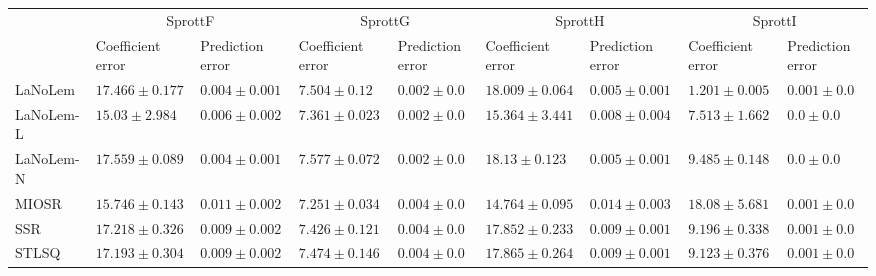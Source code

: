 \begin{table*}
{\begin{tabular}{lllllllll}
 & \multicolumn{2}{c}{SprottF} & \multicolumn{2}{c}{SprottG} & \multicolumn{2}{c}{SprottH} & \multicolumn{2}{c}{SprottI} \\
 & Coefficient error & Prediction error & Coefficient error & Prediction error & Coefficient error & Prediction error & Coefficient error & Prediction error \\
\midrule
LaNoLem & $17.466\pm 0.177$ & $0.004\pm 0.001$ & $7.504\pm 0.12$ & $0.002\pm 0.0$ & $18.009\pm 0.064$ & $0.005\pm 0.001$ & $\mathbf{1.201}\pm 0.005$ & $0.001\pm 0.0$ \\
LaNoLem-L & $\mathbf{15.03}\pm 2.984$ & $0.006\pm 0.002$ & $7.361\pm 0.023$ & $0.002\pm 0.0$ & $15.364\pm 3.441$ & $0.008\pm 0.004$ & $7.513\pm 1.662$ & $0.0\pm 0.0$ \\
LaNoLem-N & $17.559\pm 0.089$ & $\mathbf{0.004}\pm 0.001$ & $7.577\pm 0.072$ & $\mathbf{0.002}\pm 0.0$ & $18.13\pm 0.123$ & $\mathbf{0.005}\pm 0.001$ & $9.485\pm 0.148$ & $\mathbf{0.0}\pm 0.0$ \\
MIOSR & $15.746\pm 0.143$ & $0.011\pm 0.002$ & $\mathbf{7.251}\pm 0.034$ & $0.004\pm 0.0$ & $\mathbf{14.764}\pm 0.095$ & $0.014\pm 0.003$ & $18.08\pm 5.681$ & $0.001\pm 0.0$ \\
SSR & $17.218\pm 0.326$ & $0.009\pm 0.002$ & $7.426\pm 0.121$ & $0.004\pm 0.0$ & $17.852\pm 0.233$ & $0.009\pm 0.001$ & $9.196\pm 0.338$ & $0.001\pm 0.0$ \\
STLSQ & $17.193\pm 0.304$ & $0.009\pm 0.002$ & $7.474\pm 0.146$ & $0.004\pm 0.0$ & $17.865\pm 0.264$ & $0.009\pm 0.001$ & $9.123\pm 0.376$ & $0.001\pm 0.0$ \\

\midrule


\end{tabular}}
\end{table*}
